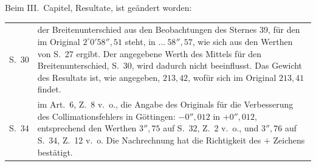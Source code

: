 {Beim III.\ Capitel, Resultate, ist geändert worden:
\par\noindent\begin{tabular}{@{}p{.065\linewidth}p{.91\linewidth}@{}}
S.\ 30&der Breitenunterschied aus den Beobachtungen des Sternes 39, für den im Original $2^\circ0'58''{,}51$ steht, in $\ldots\ 58''{,}57$, wie sich aus den Werthen von S.\ 27 ergibt. Der angegebene Werth des Mittels für den Breitenunterschied, S.\ 30, wird dadurch nicht beeinflusst. Das Gewicht des Resultats ist, wie angegeben, $213{,}42$, wofür sich im Original $213{,}41$ findet.\\
S.\ 34&im Art.\ 6, Z.\ 8 v.\ o., die Angabe des Originals für die Verbesserung des Collimationsfehlers in Göttingen: $-0''{,}012$ in $+0''{,}012$, entsprechend den Werthen $3''{,}75$ auf S.\ 32, Z.\ 2 v.\ o., und $3''{,}76$ auf S.\ 34, Z.\ 12 v.\ o. Die Nachrechnung hat die Richtigkeit des $+$ Zeichens bestätigt.
\end{tabular}\par
}

